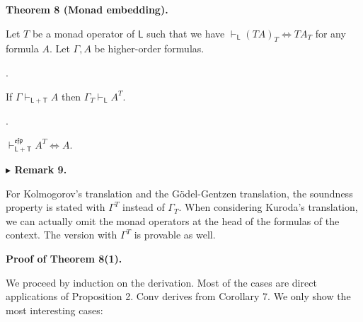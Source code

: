 \par\medskip\noindent\textbf{Theorem 8 (Monad embedding).}\par
 
 
Let $T$ be a monad operator of $\mathsf{L}$ such that we have $\vdash_{\mathsf{L}}(TA)_{T}\Leftrightarrow TA_{T}$ for any formula $A$. Let $\Gamma,A$ be higher-order formulas.\par
  
\par{}. 
 
If $\Gamma\vdash_{\mathsf{L}+\mathsf{T}}A$ then $\Gamma_{T}\vdash_{\mathsf{L}}A^{T}$.\par
 
 
 
\par{}. 
 
$\vdash_{\mathsf{L}+\mathsf{T}}^{\mathfrak{e}\mathfrak{f}\mathfrak{p}}A^{T}\Leftrightarrow
A$.\par
 
 
  
 
 
 
\par\medskip\noindent\textbf{$\blacktriangleright$ Remark 9.}\par
 
 
For Kolmogorov’s translation and the Gödel-Gentzen translation, the soundness property is stated with $\Gamma^{T}$ instead of $\Gamma_{T}$. When considering Kuroda’s translation, we can actually omit the monad operators at the head of the formulas of the context. The version with $\Gamma^{T}$ is provable as well.\par
 
 
 
 
\par\medskip\noindent\textbf{Proof of Theorem 8(1).}\par
 
 
We proceed by induction on the derivation. Most of the cases are direct applications of Proposition 2. Conv derives from Corollary 7. We only show the most interesting cases:\par
  
